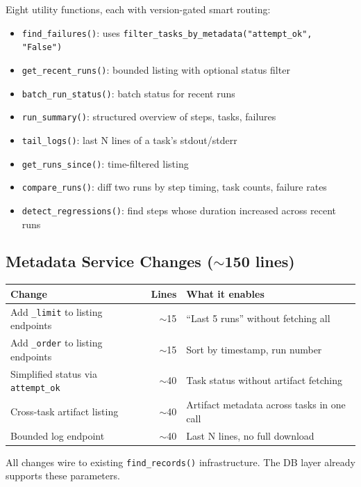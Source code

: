 \documentclass[11pt,a4paper]{article}
\begin{document}
Eight utility functions, each with version-gated smart routing:
\begin{itemize}[nosep]
    \item \texttt{find\_failures()}: uses \texttt{filter\_tasks\_by\_metadata("attempt\_ok", "False")}
    \item \texttt{get\_recent\_runs()}: bounded listing with optional status filter
    \item \texttt{batch\_run\_status()}: batch status for recent runs
    \item \texttt{run\_summary()}: structured overview of steps, tasks, failures
    \item \texttt{tail\_logs()}: last N lines of a task's stdout/stderr
    \item \texttt{get\_runs\_since()}: time-filtered listing
    \item \texttt{compare\_runs()}: diff two runs by step timing, task counts, failure rates
    \item \texttt{detect\_regressions()}: find steps whose duration increased across recent runs
\end{itemize}

\subsection{Metadata Service Changes ($\sim$150 lines)}

\begin{center}
\begin{tabular}{lrl}
\toprule
\textbf{Change} & \textbf{Lines} & \textbf{What it enables} \\
\midrule
Add \texttt{\_limit} to listing endpoints & $\sim$15 & ``Last 5 runs'' without fetching all \\
Add \texttt{\_order} to listing endpoints & $\sim$15 & Sort by timestamp, run number \\
Simplified status via \texttt{attempt\_ok} & $\sim$40 & Task status without artifact fetching \\
Cross-task artifact listing & $\sim$40 & Artifact metadata across tasks in one call \\
Bounded log endpoint & $\sim$40 & Last N lines, no full download \\
\bottomrule
\end{tabular}
\end{center}

All changes wire to existing \texttt{find\_records()} infrastructure. The DB layer already supports these parameters.
\end{document}
